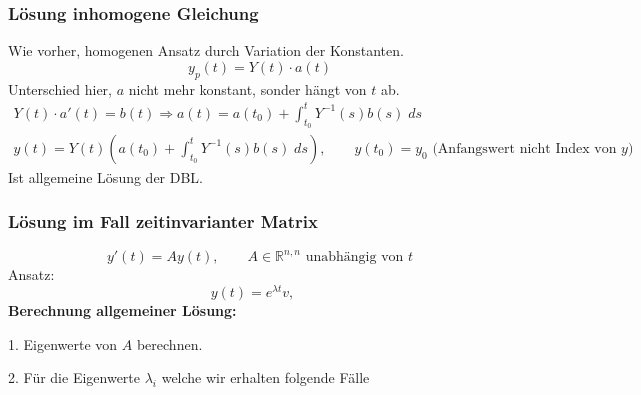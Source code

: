 \documentclass[a4paper]{article}
\newcommand{\R}{\mathbb{R}}
\begin{document}
\subsubsection{Lösung inhomogene Gleichung}
Wie vorher, homogenen Ansatz durch Variation der Konstanten.
\[
	y_p (t) = Y(t) \cdot a(t)
\]
Unterschied hier, $a$ nicht mehr konstant, sonder hängt von $t$ ab.
\begin{gather*}
	Y(t) \cdot a' (t) = b(t)
	\Rightarrow a(t) = a(t_0) +
	\int_{t_0}^{t} Y ^{-1}  (s) b(s) \; ds \\
	y(t) = Y(t) \left(
		a(t_0) + 
		\int_{t_0}^{t} Y ^{-1}  (s) b(s) \; ds
	\right), \qquad
	y(t_0) = y_0
	\text{ (Anfangswert nicht Index von $y$) }
\end{gather*}
Ist allgemeine Lösung der DBL.

\subsubsection{Lösung im Fall zeitinvarianter Matrix}
\[
	y'(t) = A y(t), \qquad
	A \in \R ^{n,n} \text{ unabhängig von $t$}
\]
Ansatz:
\[
	y(t) = e ^{\lambda t} v, \quad
\] 
\textbf{Berechnung allgemeiner Lösung:} 

1. Eigenwerte von $A$ berechnen.

2. Für die Eigenwerte $\lambda_i$ welche wir erhalten folgende
Fälle 
\end{document}
